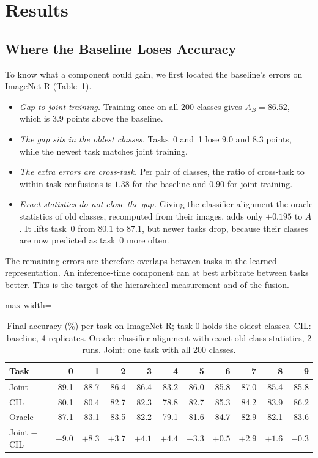 \section{Results}
\label{sec:results}

\subsection{Where the Baseline Loses Accuracy}
\label{sec:gap}

To know what a component could gain, we first located the baseline's errors
on ImageNet-R (Table~\ref{tab:gap}).
\begin{itemize}
  \item \emph{Gap to joint training.} Training once on all 200 classes gives
    $A_B=86.52$, which is $3.9$ points above the baseline.
  \item \emph{The gap sits in the oldest classes.} Tasks~0 and~1 lose $9.0$
    and $8.3$ points, while the newest task matches joint training.
  \item \emph{The extra errors are cross-task.} Per pair of classes, the
    ratio of cross-task to within-task confusions is $1.38$ for the baseline
    and $0.90$ for joint training.
  \item \emph{Exact statistics do not close the gap.} Giving the classifier
    alignment the oracle statistics of old classes, recomputed from their
    images, adds only $+0.195$ to $\bar A$. It lifts task~0 from $80.1$ to
    $87.1$, but newer tasks drop, because their classes are now predicted as
    task~0 more often.
\end{itemize}
The remaining errors are therefore overlaps between tasks in the learned
representation. An inference-time component can at best arbitrate between
tasks better. This is the target of the hierarchical measurement and of the
fusion.

\begin{table}[t]
\centering
\caption{Final accuracy (\%) per task on ImageNet-R; task 0 holds the oldest
classes. CIL: baseline, 4 replicates. Oracle: classifier alignment with
exact old-class statistics, 2 runs. Joint: one task with all 200 classes.}
\label{tab:gap}
\setlength{\tabcolsep}{4pt}
\begin{adjustbox}{max width=\textwidth}
\begin{tabular}{lrrrrrrrrrr}
\toprule
Task & 0 & 1 & 2 & 3 & 4 & 5 & 6 & 7 & 8 & 9\\
\midrule
Joint  & 89.1 & 88.7 & 86.4 & 86.4 & 83.2 & 86.0 & 85.8 & 87.0 & 85.4 & 85.8\\
CIL    & 80.1 & 80.4 & 82.7 & 82.3 & 78.8 & 82.7 & 85.3 & 84.2 & 83.9 & 86.2\\
Oracle & 87.1 & 83.1 & 83.5 & 82.2 & 79.1 & 81.6 & 84.7 & 82.9 & 82.1 & 83.6\\
\midrule
Joint $-$ CIL & $+9.0$ & $+8.3$ & $+3.7$ & $+4.1$ & $+4.4$ & $+3.3$ & $+0.5$ & $+2.9$ & $+1.6$ & $-0.3$\\
\bottomrule
\end{tabular}
\end{adjustbox}
\end{table}

